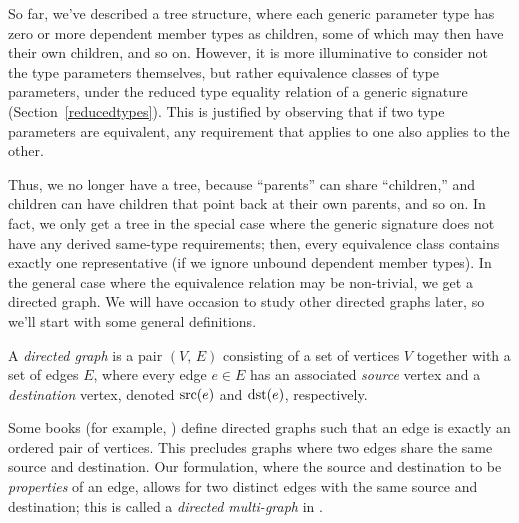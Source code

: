 \documentclass[../generics]{subfiles}
\begin{document}
So far, we've described a tree structure, where each generic parameter type has zero or more dependent member types as children, some of which may then have their own children, and so on. However, it is more illuminative to consider not the type parameters themselves, but rather equivalence classes of type parameters, under the reduced type equality relation of a generic signature (Section~\ref{reducedtypes}). This is justified by observing that if two type parameters are equivalent, any requirement that applies to one also applies to the other.

Thus, we no longer have a tree, because ``parents'' can share ``children,'' and children can have children that point back at their own parents, and so on. In fact, we only get a tree in the special case where the generic signature does not have any derived same-type requirements; then, every equivalence class contains exactly one representative (if we ignore unbound dependent member types). In the general case where the equivalence relation may be non-trivial, we get a directed graph. We will have occasion to study other directed graphs later, so we'll start with some general definitions.

\begin{definition}
A \emph{directed graph} is a pair $(V,\, E)$ consisting of a set of vertices $V$ together with a set of edges $E$, where every edge $e\in E$ has an associated \emph{source} vertex and a \emph{destination} vertex, denoted $\operatorname{src}(e)$ and $\operatorname{dst}(e)$, respectively.

Some books (for example, \cite{grimaldi}) define directed graphs such that an edge is exactly an ordered pair of vertices. This precludes graphs where two edges share the same source and destination. Our formulation, where the source and destination to be \emph{properties} of an edge, allows for two distinct edges with the same source and destination; this is called a \emph{directed multi-graph} in \cite{alggraph}.
\end{definition}
\end{document}
